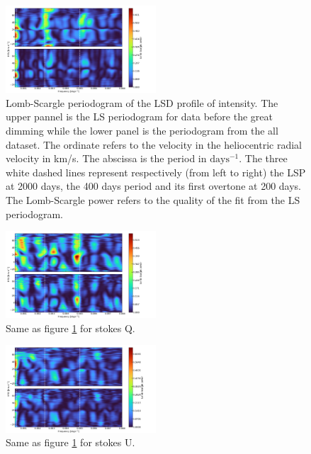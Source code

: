 \documentclass{aa}
\begin{document}
\begin{figure}[!h]
    \centering
    \includegraphics[width=0.5\textwidth]{Lomb-Scargle Intensity.png}
    \caption{Lomb-Scargle periodogram of the LSD profile of intensity. 
    The upper pannel is the LS periodogram for data before the great dimming while the lower panel is the periodogram from the all dataset.
    The ordinate refers to the velocity in the heliocentric radial velocity in km/s. The abscissa is the period in $\mathrm{days^{-1}}$. 
    The three white dashed lines represent respectively (from left to right) the LSP at 2000 days, the 400 days period and its first overtone at 200 days. 
    The Lomb-Scargle power refers to the quality of the fit from the LS periodogram. }
    \label{LS intensity}
\end{figure}

\begin{figure}[!h]
    \centering
    \includegraphics[width=0.5\textwidth]{Lomb-Scargle Stokes Q.png}
    \caption{Same as figure \ref{LS intensity} for stokes Q. }
    \label{LS Q}
\end{figure}

\begin{figure}[!h]
    \centering
    \includegraphics[width=0.5\textwidth]{Lomb-Scargle Stokes U.png}
    \caption{Same as figure \ref{LS intensity} for stokes U.}
    \label{LS U}
\end{figure}
\end{document}
